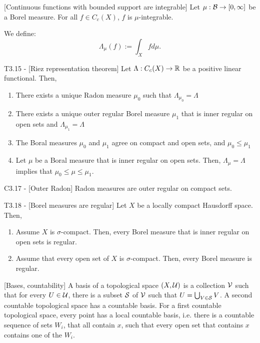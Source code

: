 \documentclass{article}
\begin{document}
\begin{flexilemma}{}[Continuous functions with bounded support are integrable]
    Let $\mu: \mathcal{B} \to [0,\infty]$ be a Borel measure. For all $f \in C_c(X)$, $f$ is $\mu$-integrable.
\end{flexilemma}

We define:
\begin{equation}
    \Lambda_\mu(f) := \int_X f d\mu.
\end{equation}

\begin{flexitheorem}{T3.15 - }[Riez representation theorem]
    Let $\Lambda : C_c(X) \to \mathbb{R}$ be a positive linear functional. Then,
    \begin{enumerate}[label = (\roman*)]
        \item There exists a unique Radon measure $\mu_0$ such that $\Lambda_{\mu_0} = \Lambda$
        \item There exists a unique outer regular Borel measure $\mu_1$ that is inner regular on open sets and $\Lambda_{\mu_1} = \Lambda$
        \item The Boral measures $\mu_0$ and $\mu_1$ agree on compact and open sets, and $\mu_0 \leq \mu_1$
        \item Let $\mu$ be a Boral measure that is inner regular on open sets. Then, $\Lambda_{\mu} = \Lambda$ implies that $\mu_0 \leq \mu \leq \mu_1$.
    \end{enumerate}
\end{flexitheorem}

\begin{flexilemma}{C3.17 - }[Outer Radon]
    Radon measures are outer regular on compact sets.
\end{flexilemma}

\begin{flexitheorem}{T3.18 - }[Borel measures are regular]
    Let $X$ be a locally compact Hausdorff space. Then,
    \begin{enumerate}[label = (\alph*)]
        \item Assume $X$ is $\sigma$-compact. Then, every Borel measure that is inner regular on open sets is regular.
        \item Assume that every open set of $X$ is $\sigma$-compact. Then, every Borel measure is regular.
    \end{enumerate}
\end{flexitheorem}

\begin{flexidefinition}{}[Bases, countability]
    A basis of a topological space $(X, \mathcal{U})$ is a collection $\mathcal{V}$ such that for every $U \in \mathcal{U}$, there is a subset $\mathcal{S}$ of $\mathcal{V}$ such that $U = \bigcup_{V \in \mathcal{S}} V$. A second countable topological space has a countable basis. For a first countable topological space, every point has a local countable basis, i.e. there is a countable sequence of sets $W_i$, that all contain $x$, such that every open set that contains $x$ contains one of the $W_i$.
\end{flexidefinition}
\end{document}
